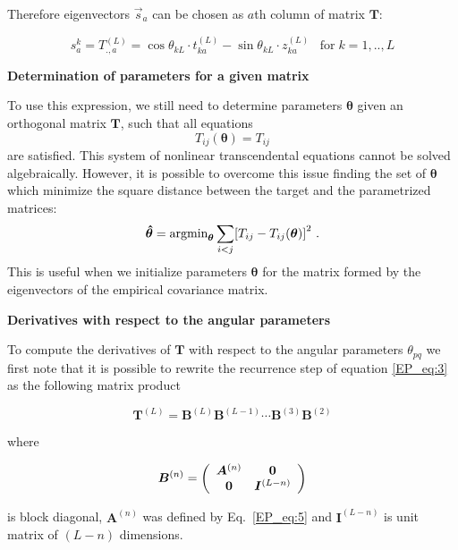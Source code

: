 \documentclass[preprint,amsmath,amssymb,superscriptaddress,showpacs,pre]{revtex4-1}
\let\originalleft\left
\let\originalright\right
\renewcommand{\left}{\mathopen{}\mathclose\bgroup\originalleft}
\renewcommand{\right}{\aftergroup\egroup\originalright}
\begin{document}
Therefore eigenvectors $\vec{s}_a$  can be chosen as $a$th column  of matrix $\bm{T}$:

\begin{equation}
s^{k}_a=T^{(L)}_{.,a}=\cos\theta_{kL} \cdot t^{(L)}_{ka}-\sin\theta_{kL}\cdot z^{(L)}_{ka} \;\;\; \text{for} \;k=1,..,L
 \label{EP_eq:8}
\end{equation}

\textbf{Determination of parameters for a given matrix}

To use this expression, we still need to determine parameters $\bm \theta$  given an orthogonal matrix $\bm T$, such that all equations
\begin{equation}
    T_{ij}(\bm \theta)=T_{ij}
\end{equation}
are satisfied. This system of nonlinear transcendental equations  cannot be solved algebraically. However, it is possible to overcome this issue finding the set of $\bm \theta$ which minimize the square distance between the target and the parametrized matrices: 
\begin{equation}
 {\bm{\hat \theta}} = \text{argmin}_{\bm \theta} \sum_{i<j}\left[ T_{ij}-T_{ij}(\bm \theta)\right] ^2 \ .
\end{equation}
This is useful when we initialize parameters $\bm \theta$ for the matrix formed by the eigenvectors of the empirical covariance matrix.


\textbf{Derivatives with respect to the angular parameters}
 
To compute the derivatives of $\bm T$ with respect to the angular parameters $\theta_{pq}$ we first note that it is possible to rewrite the recurrence step of equation \eqref{EP_eq:3} as the following matrix product
 
 \begin{equation}
 \bm T^{(L)}= \bm B^{(L)} \bm B^{(L-1)}\cdots\bm B^{(3)}\bm B^{(2)}   
 \label{EP_eq:10}
 \end{equation}

where

\begin{equation} 
\bm B^{(n)} =  \left(
\begin{array}{cc}
\bm A^{(n)} & \bm 0  \\
\bm 0 &  \bm I ^{(L-n)}\\
\end{array}
\right)
\label{EP_eq:11}
\end{equation}

is block diagonal, $\bm A^{(n)} $ was defined by Eq.~\eqref{EP_eq:5} and $\bm I ^{(L-n)}$ is unit matrix of $(L-n)$ dimensions. 
\end{document}
